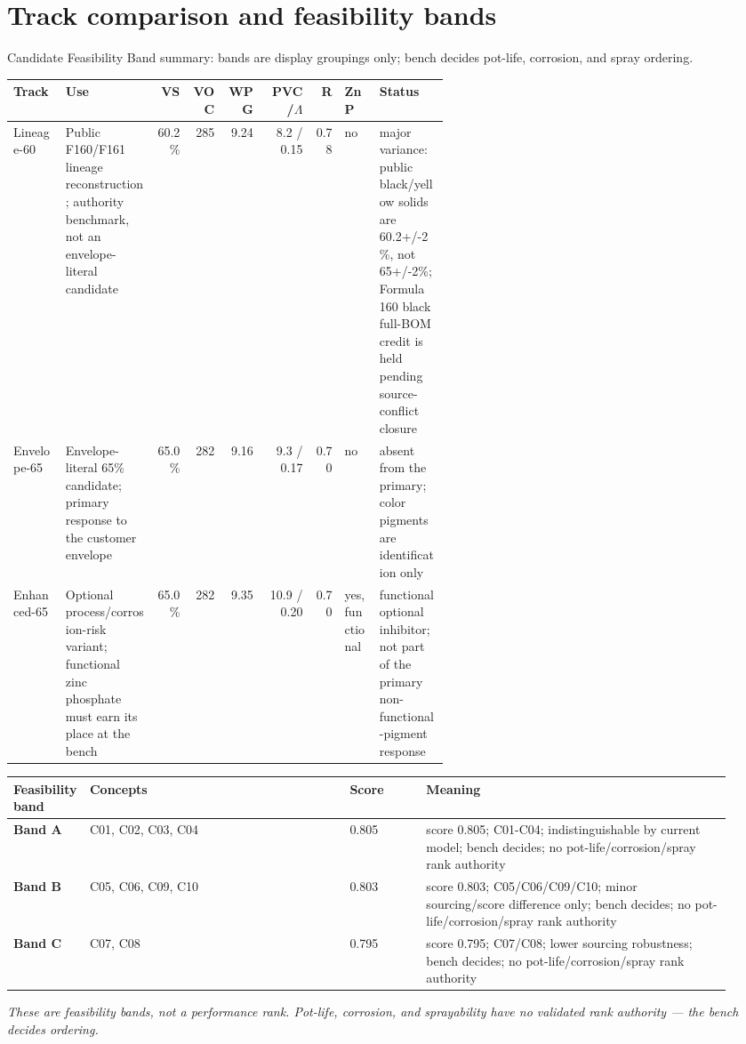 \documentclass[10pt]{article}
\begin{document}
\section{Track comparison and feasibility bands}
Candidate Feasibility Band summary: bands are display groupings only; bench decides pot-life, corrosion, and spray ordering.
\begin{longtable}{@{}p{0.12\linewidth} p{0.21\linewidth} r r r r r p{0.08\linewidth} p{0.16\linewidth}@{}}\toprule \textbf{Track} & \textbf{Use} & \textbf{VS} & \textbf{VOC} & \textbf{WPG} & \textbf{PVC/$\Lambda$} & \textbf{R} & \textbf{ZnP} & \textbf{Status} \\ \midrule Lineage-60 & Public F160/F161 lineage reconstruction; authority benchmark, not an envelope-literal candidate & 60.2\% & 285 & 9.24 & 8.2 / 0.15 & 0.78 & no & major variance: public black/yellow solids are 60.2+/-2\%, not 65+/-2\%; Formula 160 black full-BOM credit is held pending source-conflict closure \\ Envelope-65 & Envelope-literal 65\% candidate; primary response to the customer envelope & 65.0\% & 282 & 9.16 & 9.3 / 0.17 & 0.70 & no & absent from the primary; color pigments are identification only \\ Enhanced-65 & Optional process/corrosion-risk variant; functional zinc phosphate must earn its place at the bench & 65.0\% & 282 & 9.35 & 10.9 / 0.20 & 0.70 & yes, functional & functional optional inhibitor; not part of the primary non-functional-pigment response \\ \bottomrule\end{longtable}
{\footnotesize\begin{longtable}{@{}p{0.10\linewidth} p{0.34\linewidth} p{0.10\linewidth} >{\raggedright\arraybackslash}p{0.40\linewidth}@{}}\toprule \textbf{Feasibility band} & \textbf{Concepts} & \textbf{Score} & \textbf{Meaning} \\ \midrule \textbf{Band A} & C01, C02, C03, C04 & 0.805 & score 0.805; C01-C04; indistinguishable by current model; bench decides; no pot-life/corrosion/spray rank authority \\ \textbf{Band B} & C05, C06, C09, C10 & 0.803 & score 0.803; C05/C06/C09/C10; minor sourcing/score difference only; bench decides; no pot-life/corrosion/spray rank authority \\ \textbf{Band C} & C07, C08 & 0.795 & score 0.795; C07/C08; lower sourcing robustness; bench decides; no pot-life/corrosion/spray rank authority \\ \bottomrule\end{longtable}}\par{\footnotesize\emph{These are feasibility bands, not a performance rank. Pot-life, corrosion, and sprayability have no validated rank authority --- the bench decides ordering.}}
\end{document}
